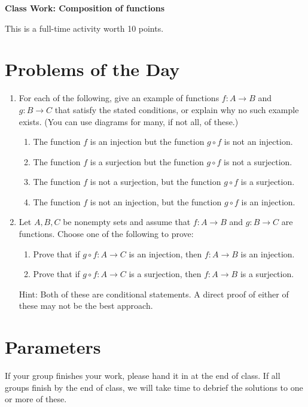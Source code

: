 \documentclass[11pt]{article}
\begin{document}
	
	\thispagestyle{empty}
	\renewcommand{\headrulewidth}{0.0pt}
	\thispagestyle{fancy}
	\lfoot{}
	\cfoot{}
	\rfoot{}	
	
	\vspace*{0in}

		\begin{center}
			\begin{large}
			\textbf{Class Work: Composition of functions} \\
			\end{large}
			This is a full-time activity worth 10 points. 
			
		\end{center}
		

\section*{Problems of the Day}

\begin{enumerate}
	\item For each of the following, give an example of functions $f: A \rightarrow B$ and $g: B \rightarrow C$ that satisfy the stated conditions, or explain why no such example exists. (You can use diagrams for many, if not all, of these.)
	\begin{enumerate}
		\item The function $f$ is an injection but the function $g \circ f$ is not an injection.
		\item The function $f$ is a surjection but the function $g \circ f$ is not a surjection.
		\item The function $f$ is not a surjection, but the function $g \circ f$ is a surjection. 
		\item The function $f$ is not an injection, but the function $g \circ f$ is an injection. 
	\end{enumerate}
	
	\item Let $A,B,C$ be nonempty sets and assume that $f: A \rightarrow B$ and $g: B \rightarrow C$ are functions. Choose one of the following to prove: 
	\begin{enumerate}
		\item Prove that if $g \circ f: A \rightarrow C$ is an injection, then $f: A \rightarrow B$ is an injection. 
		\item Prove that if $g \circ f: A \rightarrow C$ is a surjection, then $f: A \rightarrow B$ is a surjection. 
	\end{enumerate}
	Hint: Both of these are conditional statements. A direct proof of either of these may not be the best approach. 
	
\end{enumerate}

\section*{Parameters}

If your group finishes your work, please hand it in at the end of class. If all groups finish by the end of class, we will take time to debrief the solutions to one or more of these. 
\end{document}
